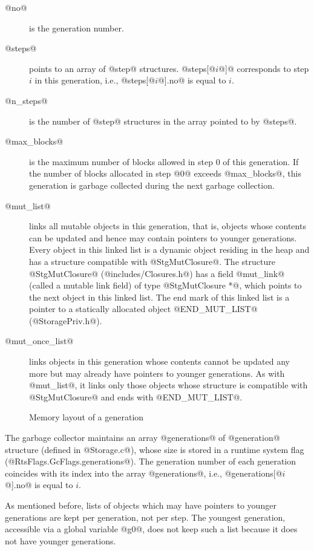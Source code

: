 \documentclass{article}
\begin{document}
\begin{description}
\item[@no@] is the generation number.
\item[@steps@] points to an array of @step@ structures. @steps[@$i$@]@ 
corresponds to step $i$ in this generation, i.e., 
@steps[@$i$@].no@ is equal to $i$.
\item[@n\_steps@] is the number of @step@ structures in the array pointed to 
by @steps@.
\item[@max\_blocks@] is the maximum number of blocks allowed in step $0$ of
this generation. If the number of blocks allocated 
in step @0@ exceeds @max_blocks@,
this generation is garbage collected during the next garbage collection.
\item[@mut\_list@] links all mutable objects in this generation, that is,
objects whose contents can be updated and hence may contain pointers to
younger generations. 
Every object in this linked list is a dynamic object residing in the heap 
and has a structure compatible with @StgMutClosure@.
The structure @StgMutClosure@ (@includes/Closures.h@) has a field 
@mut_link@ (called a mutable link field) of type @StgMutClosure *@, which
points to the next object in this linked list.
The end mark of this linked list is a pointer to a statically allocated object 
@END_MUT_LIST@ (@StoragePriv.h@).
\item[@mut\_once\_list@] links objects in this generation whose contents 
cannot be updated any more but may already have pointers to younger generations.
As with @mut_list@, it links only those objects whose structure is compatible
with @StgMutClosure@ and ends with @END_MUT_LIST@.
\end{description}

\begin{figure}[ht]
\begin{center}

\caption{Memory layout of a generation}
\label{fig-gen}
\end{center}
\end{figure}

The garbage collector maintains an array @generations@ of @generation@ structure
(defined in @Storage.c@), whose size is stored in a runtime system flag 
(@RtsFlags.GcFlags.generations@). 
The generation number of each generation coincides with its index into
the array @generations@, i.e.,  @generations[@$i$@].no@ is equal to $i$.

As mentioned before, lists of objects which may have pointers to younger
generations are kept per generation, not per step. The youngest generation,
accessible via a global variable @g0@, does not keep such a list because it
does not have younger generations.
\end{document}
